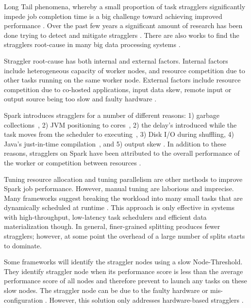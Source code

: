 \label{background}

Long Tail phenomena, whereby a small proportion of task stragglers significantly impede job completion time is a big challenge toward achieving improved performance \cite{Garraghan2016}.
Over the past few years a significant amount of research has been done trying to detect and mitigate stragglers \cite{Rosen2012, Dean2004, Chen2014, Bhandare2016, Kwon2012}. 
There are also works to find the stragglers root-cause in many big data processing systems \cite{Ballani2011, Ananthanarayanan2014, Jeyakumar2013, Li2014, Zaharia2012}.

Straggler root-cause has both internal and external factors. 
Internal factors include heterogeneous capacity of worker nodes, and resource competition due to other tasks running on the same worker node. 
External factors include resource competition due to co-hosted applications, input data skew, remote input or output source being too slow and faulty hardware \cite{Chen2014}.

Spark introduces stragglers for a number of different reasons: 1) garbage collections~\cite{Kyong2017,Ousterhout2017}, 2) JVM positioning to cores~\cite{Kyong2017}, 
2) the delay's introduced while the task moves from the scheduler to executing~\cite{Gittens2016}, 3) Disk I/O during shuffling, 4) Java's just-in-time compilation~\cite{Ousterhout2017}, 
and 5) output skew \cite{Ousterhout2017}. 
In addition to these reasons, stragglers on Spark have been attributed to the overall performance of the worker or competition between resources \cite{Yang2016}.

Tuning resource allocation and tuning parallelism are other methods to improve Spark job performance. 
However, manual tuning are laborious and imprecise. 
Many frameworks suggest breaking the workload into many small tasks that are dynamically scheduled at runtime \cite{Rosen2012}. 
This approach is only effective in systems with high-throughput, low-latency task schedulers and efficient data materialization though.
In general, finer-grained splitting produces fewer stragglers; however, at some point the overhead of a large number of splits starts to dominate. 

Some frameworks will identify the straggler nodes using a slow Node-Threshold. 
They identify straggler node when its performance score is less than the average performance score of all nodes and therefore prevent to launch any tasks on these slow nodes. 
The straggler node can be due to the faulty hardware or mis-configuration \cite{Dean2004}. 
However, this solution only addresses hardware-based stragglers \cite{Chen2014}.

